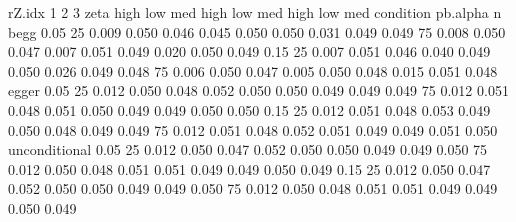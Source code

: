                           rZ.idx     1                 2                 3            
                          zeta    high   low   med  high   low   med  high   low   med
condition     pb.alpha n                                                              
begg          0.05     25        0.009 0.050 0.046 0.045 0.050 0.050 0.031 0.049 0.049
                       75        0.008 0.050 0.047 0.007 0.051 0.049 0.020 0.050 0.049
              0.15     25        0.007 0.051 0.046 0.040 0.049 0.050 0.026 0.049 0.048
                       75        0.006 0.050 0.047 0.005 0.050 0.048 0.015 0.051 0.048
egger         0.05     25        0.012 0.050 0.048 0.052 0.050 0.050 0.049 0.049 0.049
                       75        0.012 0.051 0.048 0.051 0.050 0.049 0.049 0.050 0.050
              0.15     25        0.012 0.051 0.048 0.053 0.049 0.050 0.048 0.049 0.049
                       75        0.012 0.051 0.048 0.052 0.051 0.049 0.049 0.051 0.050
unconditional 0.05     25        0.012 0.050 0.047 0.052 0.050 0.050 0.049 0.049 0.050
                       75        0.012 0.050 0.048 0.051 0.051 0.049 0.049 0.050 0.049
              0.15     25        0.012 0.050 0.047 0.052 0.050 0.050 0.049 0.049 0.050
                       75        0.012 0.050 0.048 0.051 0.051 0.049 0.049 0.050 0.049
